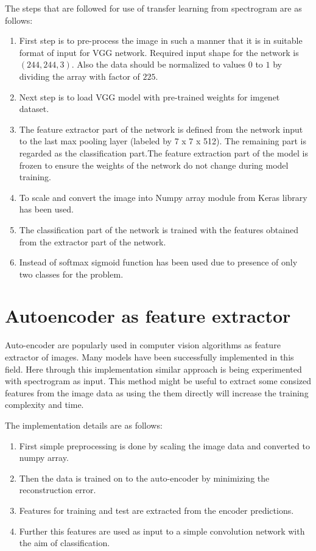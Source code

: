   The steps that are followed for use of transfer learning from spectrogram are as follows:
  \begin{enumerate}
  	\item First step is to pre-process the image in such a manner that it is in suitable format of input for VGG network. Required input shape for the network is $(244,244,3)$. Also the data should be normalized to values $0$ to $1$ by dividing the array with factor of $225$.

  	\item Next step is to load VGG model with pre-trained weights for imgenet dataset.  
  	
  	\item  The feature extractor part of the network is defined from the network input to the last max pooling layer (labeled by 7 x 7 x 512). The remaining part is regarded as the classification part.The feature extraction part of the model is frozen to ensure the weights of the network do not change during model training.
  	
  	\item To scale and convert the image into Numpy array module from Keras \cite{ketkar2017introduction} library has been used.
  	
  	\item The classification part of the network is trained with the features obtained from the extractor part of the network.
  	
    \item Instead of softmax sigmoid function has been used due to presence of only two classes for the problem.
  \end{enumerate}
  
  
  \section{Autoencoder as feature extractor}  
  
     
   Auto-encoder are popularly used in computer vision algorithms as feature extractor of images. Many models have been successfully implemented in this field. Here through this implementation similar approach is being experimented with spectrogram as input. This method might be useful to extract some consized features from the image data as using the them directly will increase the training complexity and time.  
   
   The implementation details are as follows:
   \begin{enumerate}
   	\item First simple preprocessing is done by scaling the image data and converted to numpy array. 
   	\item Then the data is trained on to the auto-encoder by minimizing the reconstruction error.
   	\item Features for training and test are extracted from the encoder predictions.
   	\item Further this features are used as input to a simple convolution network with the aim of classification. 
   \end{enumerate}
   
